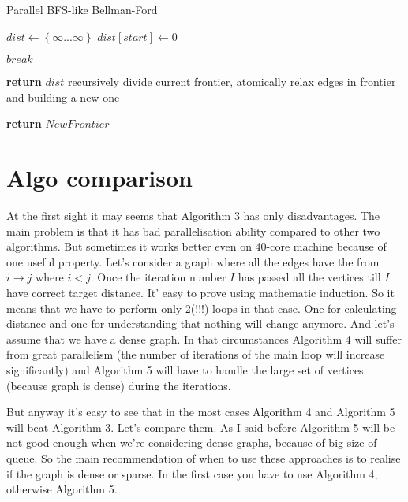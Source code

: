 \FloatBarrier
\begin{algorithm}
\caption{Parallel BFS-like Bellman-Ford}\label{bf_bfs_par}
\begin{algorithmic}[1]
\State $dist\gets \left\{ {\infty ... \infty}\right\}$
\State $dist[start] \gets 0$
	  
	
		\State $break$						
	\EndIf
		
		
\EndFor
\State \textbf{return} $dist$
\EndProcedure
\State
{}
\State recursively divide current frontier, atomically relax edges in frontier and building a new one

\State \textbf{return} $NewFrontier$
\EndProcedure

\end{algorithmic}
\end{algorithm}


\FloatBarrier
\section{Algo comparison}
At the first sight it may seems that Algorithm 3 has only disadvantages. The main problem is that it has bad parallelisation ability compared to other two algorithms. But sometimes it works better even on 40-core machine because of one useful property. Let's consider a graph where all the edges have the from $i \rightarrow j$ where $i < j$. Once the iteration number $I$ has passed all the vertices till $I$ have correct target distance. It' easy to prove using mathematic induction. So it means that we have to perform only 2(!!!) loops in that case. One for calculating distance and one for understanding that nothing will change anymore. And let's assume that we have a dense graph. In that circumstances Algorithm 4 will suffer from great parallelism (the number of iterations of the main loop will increase significantly) and Algorithm 5 will have to handle the large set of vertices (because graph is dense) during the iterations. 

But anyway it's easy to see that in the most cases Algorithm 4 and Algorithm 5 will beat Algorithm 3. Let's compare them. As I said before Algorithm 5 will be not good enough when we're considering dense graphs, because of big size of queue. So the main recommendation of when to use these approaches is to realise if the graph is dense or sparse. In the first case you have to use Algorithm 4, otherwise Algorithm 5.


